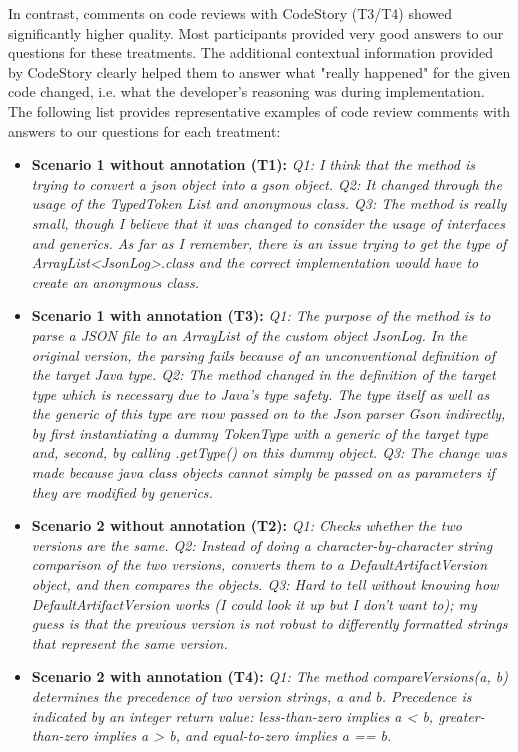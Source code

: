 \documentclass[../manifest.tex]{subfiles}
\begin{document}
In contrast, comments on code reviews with CodeStory (T3/T4) showed significantly higher quality. Most participants provided very good answers to our questions for these treatments. The additional contextual information provided by CodeStory clearly helped them to answer what "really happened" for the given code changed, i.e. what the developer's reasoning was during implementation. The following list provides representative examples of code review comments with answers to our questions for each treatment:

\begin{itemize}
  \item \textbf{Scenario 1 without annotation (T1):}
\textit{
Q1: I think that the method is trying to convert a json object into a gson object.
Q2: It changed through the usage of the TypedToken List and anonymous class.
Q3: The method is really small, though I believe that it was changed to consider the usage of interfaces and generics. As far as I remember, there is an issue trying to get the type of  ArrayList<JsonLog>.class and the correct implementation would have to create an anonymous class.
}
  \item \textbf{Scenario 1 with annotation (T3):}
\textit{
Q1: The purpose of the method is to parse a JSON file to an ArrayList of the custom object JsonLog. In the original version, the parsing fails because of an unconventional definition of the target Java type.
Q2: The method changed in the definition of the target type which is necessary due to Java's type safety. The type itself as well as the generic of this type are now passed on to the Json parser Gson indirectly, by first instantiating a dummy TokenType with a generic of the target type and, second, by calling .getType() on this dummy object. 
Q3: The change was made because java class objects cannot simply be passed on as parameters if they are modified by generics.
}
  \item \textbf{Scenario 2 without annotation (T2):}
\textit{
Q1: Checks whether the two versions are the same.
Q2: Instead of doing a character-by-character string comparison of the two versions, converts them to a DefaultArtifactVersion object, and then compares the objects.
Q3: Hard to tell without knowing how DefaultArtifactVersion works (I could look it up but I don't want to); my guess is that the previous version is not robust to differently formatted strings that represent the same version.
}
  \item \textbf{Scenario 2 with annotation (T4):}
\textit{
Q1: The method compareVersions(a, b) determines the precedence of two version strings, a and b. Precedence is indicated by an integer return value: less-than-zero implies a < b, greater-than-zero implies a > b, and equal-to-zero implies a == b.
}
\end{itemize}
\end{document}
